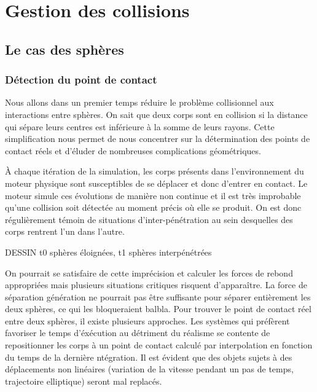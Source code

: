 \section{Gestion des collisions}

\subsection{Le cas des sphères}

\subsubsection{Détection du point de contact}

Nous allons dans un premier temps réduire le problème collisionnel aux interactions entre sphères. On sait que deux corps sont en collision si la distance qui sépare leurs centres est inférieure à la somme de leurs rayons. Cette simplification nous permet de nous concentrer sur la détermination des points de contact réels et d'éluder de nombreuses complications géométriques.

\`A chaque itération de la simulation, les corps présents dans l'environnement du moteur physique sont susceptibles de se déplacer et donc d'entrer en contact. Le moteur simule ces évolutions de manière non continue et il est très improbable qu'une collision soit détectée au moment précis o\`u elle se produit. On est donc régulièrement témoin de situations d'inter-pénétration au sein desquelles des corps rentrent l'un dans l'autre.

DESSIN t0 sphères éloignées, t1 sphères interpénétrées

On pourrait se satisfaire de cette imprécision et calculer les forces de rebond appropriées mais plusieurs situations critiques risquent d'apparaître. La force de séparation génération ne pourrait pas être suffisante pour séparer entièrement les deux sphères, ce qui les bloqueraient balbla. Pour trouver le point de contact réel entre deux sphères, il existe plusieurs approches. Les systèmes qui préfèrent favoriser le temps d'éxécution au détriment du réalisme se contente de repositionner les corps à un point de contact calculé par interpolation en fonction du temps de la dernière ntégration. Il est évident que des objets sujets à des déplacements non linéaires (variation de la vitesse pendant un pas de temps, trajectoire elliptique) seront mal replacés.

